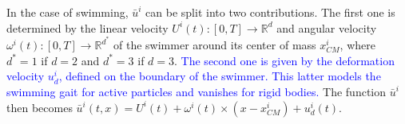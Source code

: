 \documentclass[graybox]{svmult}
\newcommand{\review}[1]{\textcolor{blue}{#1}}
\newcommand{\Fluid}{\mathcal{F}} %
\newcommand{\Real}{\mathbb{R}} %
\newcommand{\Alemap}{\mathcal{A}} %
\newcommand{\ALE}{ALE} %
\newcommand{\Vel}{u} %
\newcommand{\Pres}{p} %
\newcommand{\Density}{\rho} %
\newcommand{\tvel}{U} %
\newcommand{\angvel}{\omega} %
\newcommand{\CenterMassi}{x_{CM}^i}
\newcommand{\R}{\mathbb{R}}
\begin{document}
In the case of swimming, $\bar{\Vel}^i$ can be split into two contributions. The first one is determined by the linear velocity $\tvel^i(t): [0,T]\to\R^d$ and angular velocity  $\angvel^i(t):[0,T]\to \R^{d^*}$ of the swimmer around its center of mass $\CenterMassi$, where $d^*=1$ if $d=2$ and $d^*=3$ if $d=3$.  \review{The second one is given by the deformation velocity $u_d^i$, defined on the boundary of the swimmer. This latter models the swimming gait for active particles and vanishes for rigid bodies.} The function $\bar{u}^i$ then becomes $\bar{\Vel}^i(t,x) = \tvel^i(t) + \angvel^i(t)\times (x-\CenterMassi)+ \Vel_d^i(t)$.




\end{document}
